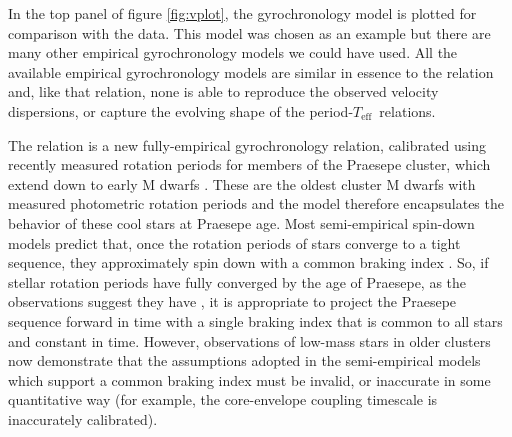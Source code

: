 \documentclass{aastex63}
\newcommand{\eg}{{\it e.g.}}
\newcommand{\etal}{{\it et al.}}
\newcommand{\teff}{$T_{\mathrm{eff}}$}
\newcommand{\racomment}[1]{{\color{black}#1}}
\begin{document}
\racomment{In the top panel of figure \ref{fig:vplot}, the \citet{angus2019}
gyrochronology model is plotted for comparison with the data.
This model was chosen as an example but there are many other empirical
gyrochronology models we could have used.
All the available empirical gyrochronology models are similar in essence to
the \citet{angus2019} relation and, like that relation, none is able to
reproduce the observed velocity dispersions, or capture the evolving shape of
the period-\teff\ relations.

The \citet{angus2019} relation is a new fully-empirical gyrochronology
relation, calibrated using recently measured rotation periods for members of
the Praesepe cluster, which extend down to early M dwarfs \citep{rebull2017,
douglas2017}.
These are the oldest cluster M dwarfs with measured photometric rotation
periods and the \citet{angus2019} model therefore encapsulates the behavior of
these cool stars at Praesepe age.
Most semi-empirical spin-down models predict that, once the rotation periods of
stars converge to a tight sequence, they approximately spin down with a common
braking index \citep[e.g., Fig. 5 in][]{gallet2015}.
So, if stellar rotation periods have fully converged by the age of Praesepe,
as the observations suggest they have \citep{douglas2019}, it is appropriate
to project the Praesepe sequence forward in time with a single braking index
that is common to all stars and constant in time.
However, observations of low-mass stars in older clusters \citep[\eg, NGC
6811, NGC 752, and Ruprecht 147][Curtis \etal\ 2020, submitted]{curtis2019,
agueros2018} now demonstrate that the assumptions adopted in the
semi-empirical models which support a common braking index must be invalid, or
inaccurate in some quantitative way (for example, the core-envelope coupling
timescale is inaccurately calibrated).

}
\end{document}
